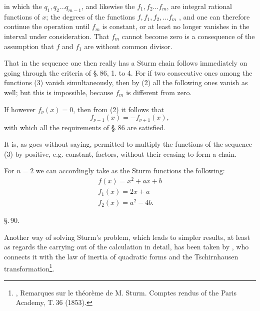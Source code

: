 in which the $q_1, q_2 \ldots q_{m-1}$, and likewise the $f_1, f_2 \ldots f_m$, are integral rational functions of $x$; the degrees of the functions $f, f_1, f_2, \ldots f_m$ , and one can therefore continue the operation until $f_m$ is constant, or at least no longer vanishes in the interval under consideration. That $f_m$ cannot become zero is a consequence of the assumption that $f$ and $f_1$ are without common divisor.

That in the sequence
one then really has a Sturm chain follows immediately on going through the criteria of \S.\,86, 1. to 4. For if two consecutive ones among the functions (3) vanish simultaneously, then by (2) all the following ones vanish as well; but this is impossible, because $f_m$ is different from zero.

If however $f_\nu(x) = 0$, then from (2) it follows that
\[ f_{\nu-1}(x) = -f_{\nu+1}(x), \]
with which all the requirements of \S.\,86 are satisfied.

It is, as goes without saying, permitted to multiply the functions of the sequence (3) by positive, e.g. constant, factors, without their ceasing to form a  chain.

For $n=2$ we can accordingly take as the Sturm functions the following:
\[
\begin{gathered}
f(x) = x^2 + a x + b\\
f_1(x) = 2x + a\\
f_2(x) = a^2 - 4b.
\end{gathered}
\]

\begin{center}
\S.\,90.

\end{center}

Another way of solving Sturm's problem, which leads to simpler results, at least as regards the carrying out of the calculation in detail, has been taken by , who connects it with the law of inertia of quadratic forms and the Tschirnhausen transformation\footnote{, Remarques sur le th\'eor\`eme de M. Sturm. Comptes rendus of the Paris Academy, T.\,36 (1853).}.
